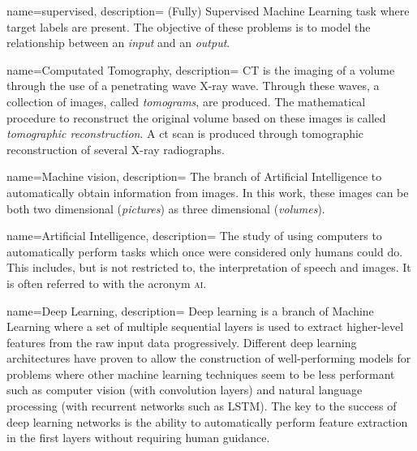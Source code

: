 {
        name={supervised},
        description={
                (Fully) Supervised Machine Learning task where target labels are present. 
                The objective of these problems is to model the relationship between an \textit{input} and an \textit{output}.
                }
}

{
        name={Computated Tomography},
        description={
                CT is the imaging of a volume through the use of a penetrating wave X-ray wave. 
                Through these waves, a collection of images, called \textit{tomograms}, are produced.
                The mathematical procedure to reconstruct the original volume based on these images is called \textit{tomographic reconstruction}.
                A \acrfull{ct} scan is produced through tomographic reconstruction of several X-ray radiographs.
                }
}

{
        name={Machine vision},
        description={
                The branch of Artificial Intelligence to automatically obtain information from images. 
                In this work, these images can be both two dimensional (\textit{pictures}) as three dimensional (\textit{volumes}).
                }
}

{
        name={Artificial Intelligence},
        description={
                The study of using computers to automatically perform tasks which once were considered only humans could do.
                This includes, but is not restricted to, the interpretation of speech and images. It is often referred to with the acronym \textsc{ai}.
                }
}

{
        name={Deep Learning},
        description={
                Deep learning is a branch of Machine Learning where a set of multiple sequential layers is used to extract higher-level features from the raw input data progressively.
                Different deep learning architectures have proven to allow the construction of well-performing models for problems where other machine learning techniques seem to be less performant such as
                computer vision (with convolution layers) and natural language processing (with recurrent networks such as LSTM). 
                The key to the success of deep learning networks is the ability to automatically perform feature extraction in the first layers without requiring human guidance.
                }
}

